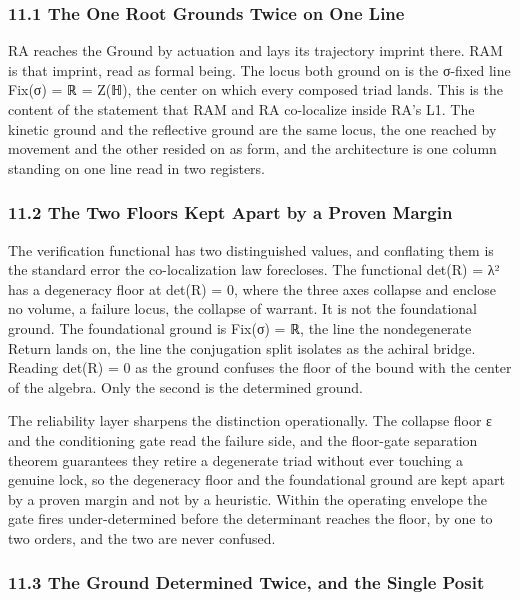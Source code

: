 \documentclass[10pt,twocolumn]{article}
\begin{document}
\hypertarget{the-one-root-grounds-twice-on-one-line}{%
\subsubsection{11.1 The One Root Grounds Twice on One
Line}\label{the-one-root-grounds-twice-on-one-line}}

RA reaches the Ground by actuation and lays its trajectory imprint
there. RAM is that imprint, read as formal being. The locus both ground
on is the σ-fixed line Fix(σ) = ℝ = Z(ℍ), the center on which every
composed triad lands. This is the content of the statement that RAM and
RA co-localize inside RA's L1. The kinetic ground and the reflective
ground are the same locus, the one reached by movement and the other
resided on as form, and the architecture is one column standing on one
line read in two registers.

\hypertarget{the-two-floors-kept-apart-by-a-proven-margin}{%
\subsubsection{11.2 The Two Floors Kept Apart by a Proven
Margin}\label{the-two-floors-kept-apart-by-a-proven-margin}}

The verification functional has two distinguished values, and conflating
them is the standard error the co-localization law forecloses. The
functional det(R) = λ² has a degeneracy floor at det(R) = 0, where the
three axes collapse and enclose no volume, a failure locus, the collapse
of warrant. It is not the foundational ground. The foundational ground
is Fix(σ) = ℝ, the line the nondegenerate Return lands on, the line the
conjugation split isolates as the achiral bridge. Reading det(R) = 0 as
the ground confuses the floor of the bound with the center of the
algebra. Only the second is the determined ground.

The reliability layer sharpens the distinction operationally. The
collapse floor ε and the conditioning gate read the failure side, and
the floor-gate separation theorem guarantees they retire a degenerate
triad without ever touching a genuine lock, so the degeneracy floor and
the foundational ground are kept apart by a proven margin and not by a
heuristic. Within the operating envelope the gate fires under-determined
before the determinant reaches the floor, by one to two orders, and the
two are never confused.

\hypertarget{the-ground-determined-twice-and-the-single-posit}{%
\subsubsection{11.3 The Ground Determined Twice, and the Single
Posit}\label{the-ground-determined-twice-and-the-single-posit}}
\end{document}
